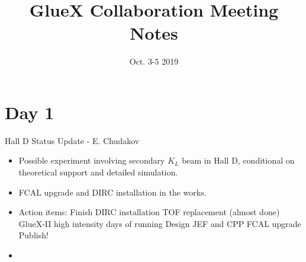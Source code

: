 \documentclass[a4paper,twoside]{article}
\title{GlueX Collaboration Meeting Notes}
\date{Oct. 3-5 2019}
\begin{document}
\maketitle
\section{Day 1}
Hall D Status Update - E. Chudakov
\begin{itemize}
    \item Possible experiment involving secondary $ K_L $ beam in Hall D, conditional on theoretical support and detailed simulation.
    \item FCAL upgrade and DIRC installation in the works.
    \item Action items:
        \subitem Finish DIRC installation
        \subitem TOF replacement (almost done)
        \subitem GlueX-II high intensity
         days of running
        \subitem Design JEF and CPP
        \subitem FCAL upgrade
        \subitem Publish!
    \item 
\end{itemize}
\end{document}
